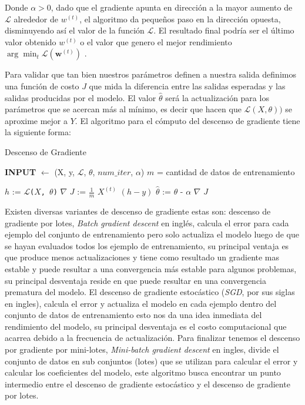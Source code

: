 Donde $ \alpha > 0$, dado que el gradiente apunta en  dirección a la mayor aumento de $\mathcal{L}$ alrededor de $w^{(t)}$, el algoritmo da pequeños paso en la dirección opuesta, disminuyendo así el valor de la función $\mathcal{L}$. El resultado final podría ser el último valor obtenido $w^{(t)}$ o el valor que genero el mejor rendimiento $\arg\min_{t}\mathcal{L}(\textbf{w}^{(t)})$ \citep{gradient_des}.


Para validar que tan bien nuestros parámetros definen a nuestra salida definimos una función de costo $J$ que mida la diferencia entre las salidas esperadas y las salidas producidas por el modelo.  El valor $\hat\theta$ será la actualización  para los parámetros que se acercan más al mínimo, es decir que hacen que $\mathcal{L}(X,\theta ))$ se aproxime mejor a $Y$.  El algoritmo para el cómputo del descenso de gradiente tiene la siguiente forma:


\begin{algorithm}[H] \caption{Descenso de Gradiente}\label{euclid}
\begin{algorithmic}[1]
\State \textbf{INPUT} $\gets$ (X, y, $\mathcal{L}$, $\theta$, $num\_iter$, $\alpha$)
\State $m$ = cantidad de datos de entrenamiento

	\State $h$ := \texttt{$\mathcal{L}$($X$, $\theta$)}
	\State $\nabla$ $J$ := $\frac{1}{m}$ $X^{(t)}$ $(h-y)$
	\State $\hat{\theta}$ := $\theta$ - $\alpha$ $\nabla$ $J$
\EndFor

\end{algorithmic}
\end{algorithm}


Existen diversas variantes de descenso de gradiente \citep{variants_gd} estas son: descenso de gradiente por lotes, \textit{Batch gradient descent} en inglés, calcula el error para cada ejemplo del conjunto de entrenamiento pero solo actualiza el modelo luego de que se hayan evaluados todos los ejemplo de entrenamiento, su principal ventaja es que produce menos actualizaciones y tiene como resultado un gradiente mas estable y puede resultar a una convergencia más estable para algunos problemas, su principal desventaja reside en que puede resultar en una convergencia prematura del modelo. El descenso de gradiente estocástico (\textit{SGD}, por sus siglas en ingles), calcula el error y actualiza el modelo en cada ejemplo dentro del conjunto de datos de entrenamiento esto nos da una idea inmediata del rendimiento del modelo, su principal desventaja es el costo computacional que acarrea debido a la frecuencia de actualización. Para finalizar tenemos el descenso por gradiente por mini-lotes, \textit{Mini-batch gradient descent} en ingles, divide el conjunto de datos en sub conjuntos (lotes) que se utilizan para calcular el error y calcular los coeficientes del modelo, este algoritmo busca encontrar un punto intermedio entre el descenso de gradiente estocástico y el descenso de gradiente por lotes.

